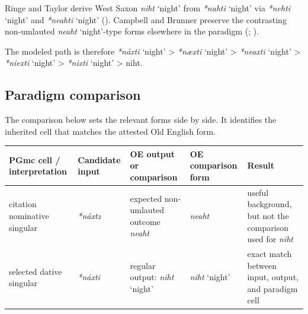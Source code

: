 \documentclass[
  british,
  a4paper,
  openany]{book}
\newcounter{none} %
\providecommand{\Recon}[1]{\emph{*#1}}
{\catcode`→=\active \global\def→{\ensuremath{\rightarrow}}}
\providecommand{\Recon}[1]{\emph{*#1}}
{\catcode`→=\active \global\def→{\ensuremath{\rightarrow}}}
\begin{document}
Ringe and Taylor derive West Saxon \emph{niht} `night' from
\Recon{nahti} `night' via \Recon{nehti} `night' and \Recon{neahti}
`night' ().
Campbell and Brunner preserve the contrasting non-umlauted
{\emph{neaht}} `night'-type forms elsewhere in the paradigm
(;
).

The modeled path is therefore \Recon{náxti} `night' \textgreater{}
\Recon{næxti} `night' \textgreater{} \Recon{neaxti} `night'
\textgreater{} \Recon{niexti} `night' \textgreater{} \Recon{nixti}
`night' \textgreater{} niht.

\subsection{Paradigm comparison}\label{paradigm-comparison-12}

The comparison below sets the relevant forms side by side. It identifies
the inherited cell that matches the attested Old English form.

{\def\LTcaptype{none} %
\begin{longtable}[]{@{}
  >{\raggedright\arraybackslash}p{}
  >{\raggedright\arraybackslash}p{}
  >{\raggedright\arraybackslash}p{}
  >{\raggedright\arraybackslash}p{}
  >{\raggedright\arraybackslash}p{}@{}}
\toprule\noalign{}
\begin{minipage}[b]{\linewidth}\raggedright
PGmc cell / interpretation
\end{minipage} & \begin{minipage}[b]{\linewidth}\raggedright
Candidate input
\end{minipage} & \begin{minipage}[b]{\linewidth}\raggedright
OE output or comparison
\end{minipage} & \begin{minipage}[b]{\linewidth}\raggedright
OE comparison form
\end{minipage} & \begin{minipage}[b]{\linewidth}\raggedright
Result
\end{minipage} \\
\midrule\noalign{}
\endhead
\bottomrule\noalign{}
\endlastfoot
citation nominative singular & {\emph{*náxtz}} & expected non-umlauted
outcome {\emph{neaht}} & {\emph{neaht}} & useful background, but not the
comparison used for \emph{niht} \\
selected dative singular & {\emph{*náxti}} & regular output:
{\emph{niht}} `night' & {\emph{niht}} `night' & exact match between
input, output, and paradigm cell \\
\end{longtable}
}
\end{document}
